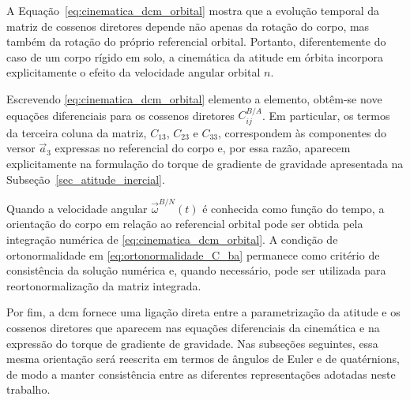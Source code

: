 A Equação~\eqref{eq:cinematica_dcm_orbital} mostra que a evolução temporal da matriz de cossenos diretores depende não apenas da rotação do corpo, mas também da rotação do próprio referencial orbital. Portanto, diferentemente do caso de um corpo rígido em solo, a cinemática da atitude em órbita incorpora explicitamente o efeito da velocidade angular orbital $n$.

Escrevendo \eqref{eq:cinematica_dcm_orbital} elemento a elemento, obtêm-se nove equações diferenciais para os cossenos diretores $C_{ij}^{B/A}$.
Em particular, os termos da terceira coluna da matriz, $C_{13}$, $C_{23}$ e $C_{33}$, correspondem às componentes do versor $\vec{a}_3$ expressas no referencial do corpo e, por essa razão, aparecem explicitamente na formulação do torque de gradiente de gravidade apresentada na Subseção~\ref{sec_atitude_inercial}.

Quando a velocidade angular $\vec{\omega}^{B/N}(t)$ é conhecida como função do tempo, a orientação do corpo em relação ao referencial orbital pode ser obtida pela integração numérica de \eqref{eq:cinematica_dcm_orbital}. A condição de ortonormalidade em \eqref{eq:ortonormalidade_C_ba} permanece como critério de consistência da solução numérica e, quando necessário, pode ser utilizada para reortonormalização da matriz integrada.

Por fim, a \gls{dcm} fornece uma ligação direta entre a parametrização da atitude e os cossenos diretores que aparecem nas equações diferenciais da cinemática e na expressão do torque de gradiente de gravidade. Nas subseções seguintes, essa mesma orientação será reescrita em termos de ângulos de Euler e de quatérnions, de modo a manter consistência entre as diferentes representações adotadas neste trabalho.